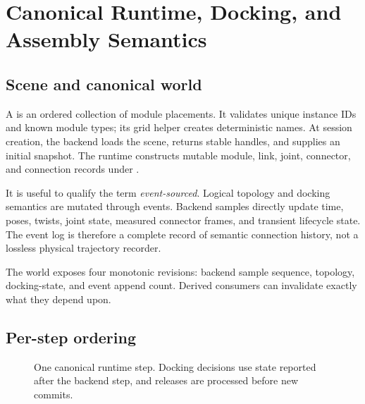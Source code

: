 \section{Canonical Runtime, Docking, and Assembly Semantics}
\label{sec:runtime}

\subsection{Scene and canonical world}

A  is an ordered collection of module placements. It validates unique
instance IDs and known module types; its grid helper creates deterministic names. At
session creation, the backend loads the scene, returns stable handles, and supplies an
initial snapshot. The runtime constructs mutable module, link, joint, connector, and
connection records under .

It is useful to qualify the term \emph{event-sourced}. Logical topology and docking
semantics are mutated through events. Backend samples directly update time, poses,
twists, joint state, measured connector frames, and transient lifecycle state. The
event log is therefore a complete record of semantic connection history, not a
lossless physical trajectory recorder.

The world exposes four monotonic revisions: backend sample sequence, topology,
docking-state, and event append count. Derived consumers can invalidate exactly what
they depend upon.

\subsection{Per-step ordering}

\begin{figure}[htbp]
\centering
{}
\caption{One canonical runtime step. Docking decisions use state reported after the
backend step, and releases are processed before new commits.}
\label{fig:step-pipeline}
\end{figure}

